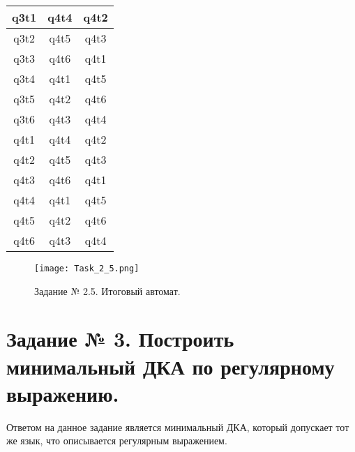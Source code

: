 \documentclass[a4paper, 12pt]{article}
\begin{document}
\begin{enumerate}
\begin{center}
\begin{tabular}{ |c|c|c| }
q3t1 & q4t4 & q4t2 \\
\hline
q3t2 & q4t5 & q4t3 \\
\hline
q3t3 & q4t6 & q4t1 \\
\hline
q3t4 & q4t1 & q4t5 \\
\hline
q3t5 & q4t2 & q4t6 \\
\hline
q3t6 & q4t3 & q4t4 \\
\hline

q4t1 & q4t4 & q4t2 \\
\hline
q4t2 & q4t5 & q4t3 \\
\hline
q4t3 & q4t6 & q4t1 \\
\hline
q4t4 & q4t1 & q4t5 \\
\hline
q4t5 & q4t2 & q4t6 \\
\hline
q4t6 & q4t3 & q4t4 \\
\hline

\end{tabular}
\end{center}

\begin{figure}[!h]
\centering
\texttt{[image: Task\_2\_5.png]}
\caption{Задание № 2.5. Итоговый автомат.}
\end{figure}

\end{enumerate}

\newpage

\section{Задание № 3. Построить минимальный ДКА по регулярному выражению.}

Ответом на данное задание является минимальный ДКА, который допускает тот же язык, что описывается регулярным выражением.
\end{document}
